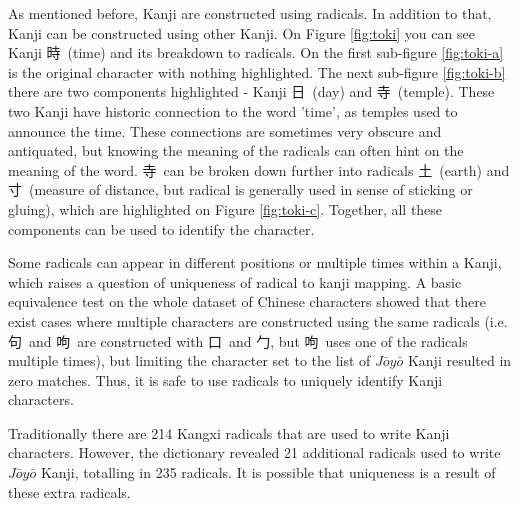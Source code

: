 \documentclass{article}
\begin{document}
\begin{CJK*}{UTF8}{min}
As mentioned before, Kanji are constructed using radicals. In addition to that, Kanji can be constructed using other Kanji. On Figure \ref{fig:toki} you can see Kanji 時\ (time) and its breakdown to radicals. On the first sub-figure \ref{fig:toki-a} is the original character with nothing highlighted. The next sub-figure \ref{fig:toki-b} there are two components highlighted - Kanji 日\ (day) and 寺\ (temple). These two Kanji have historic connection to the word 'time', as temples used to announce the time. These connections are sometimes very obscure and antiquated, but knowing the meaning of the radicals can often hint on the meaning of the word. 寺\ can be broken down further into radicals 土\ (earth) and 寸\ (measure of distance, but radical is generally used in sense of sticking or gluing), which are highlighted on Figure \ref{fig:toki-c}. Together, all these components can be used to identify the character.

Some radicals can appear in different positions or multiple times within a Kanji, which raises a question of uniqueness of radical to kanji mapping. A basic equivalence test on the whole dataset of Chinese characters showed that there exist cases where multiple characters are constructed using the same radicals (i.e. 句\ and 呴\ are constructed with 口\ and 勹, but 呴\ uses one of the radicals multiple times), but limiting the character set to the list of $J\bar{o}y\bar{o}$ Kanji resulted in zero matches. Thus, it is safe to use radicals to uniquely identify Kanji characters.

Traditionally there are 214 Kangxi radicals that are used to write Kanji characters. However, the dictionary revealed 21 additional radicals used to write $J\bar{o}y\bar{o}$ Kanji, totalling in 235 radicals. It is possible that uniqueness is a result of these extra radicals.


\end{CJK*}
\end{document}
